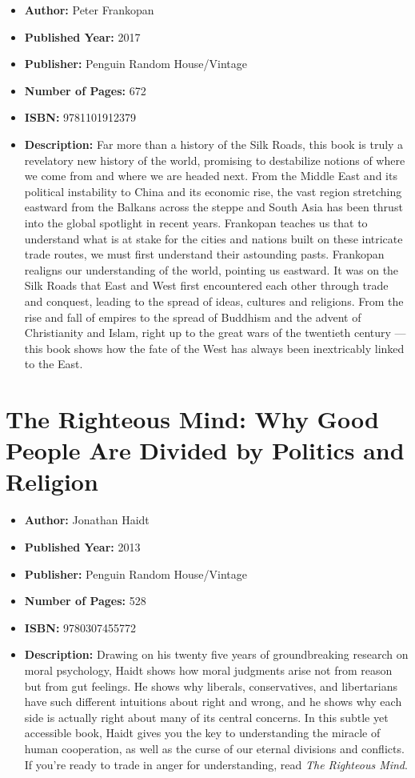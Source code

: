 \documentclass{tufte-handout}
\begin{document}
\begin{itemize}
    \item[] \textbf{Author:} Peter Frankopan
    \item[] \textbf{Published Year:} 2017
    \item[] \textbf{Publisher:} Penguin Random House/Vintage
    \item[] \textbf{Number of Pages:} 672      
    \item[] \textbf{ISBN:} 9781101912379
    \item[] \textbf{Description:} Far more than a history of the Silk Roads, this book is truly a revelatory new history of the world, promising to destabilize notions of where we come from and where we are headed next. From the Middle East and its political instability to China and its economic rise, the vast region stretching eastward from the Balkans across the steppe and South Asia has been thrust into the global spotlight in recent years. Frankopan teaches us that to understand what is at stake for the cities and nations built on these intricate trade routes, we must first understand their astounding pasts. Frankopan realigns our understanding of the world, pointing us eastward. It was on the Silk Roads that East and West first encountered each other through trade and conquest, leading to the spread of ideas, cultures and religions. From the rise and fall of empires to the spread of Buddhism and the advent of Christianity and Islam, right up to the great wars of the twentieth century --- this book shows how the fate of the West has always been inextricably linked to the East.
\end{itemize}

\section*{The Righteous Mind: Why Good People Are Divided by Politics and Religion}

\begin{itemize}
    \item[] \textbf{Author:} Jonathan Haidt
    \item[] \textbf{Published Year:} 2013
    \item[] \textbf{Publisher:} Penguin Random House/Vintage
    \item[] \textbf{Number of Pages:} 528      
    \item[] \textbf{ISBN:} 9780307455772
    \item[] \textbf{Description:} Drawing on his twenty five years of groundbreaking research on moral psychology, Haidt shows how moral judgments arise not from reason but from gut feelings. He shows why liberals, conservatives, and libertarians have such different intuitions about right and wrong, and he shows why each side is actually right about many of its central concerns. In this subtle yet accessible book, Haidt gives you the key to understanding the miracle of human cooperation, as well as the curse of our eternal divisions and conflicts. If you’re ready to trade in anger for understanding, read \textit{The Righteous Mind}.
\end{itemize}
\end{document}
